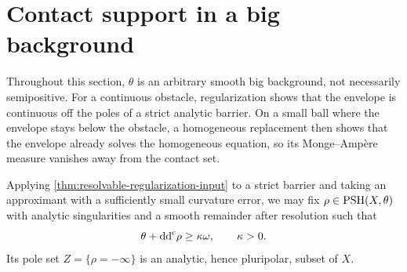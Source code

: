 \section{Contact support in a big background}
\label{sec:big-continuous-contact}

Throughout this section, $\theta$ is an arbitrary smooth big background, not necessarily semipositive. For a continuous obstacle, regularization shows that the envelope is continuous off the poles of a strict analytic barrier. On a small ball where the envelope stays below the obstacle, a homogeneous replacement then shows that the envelope already solves the homogeneous equation, so its Monge--Amp\`ere measure vanishes away from the contact set.

Applying \cref{thm:resolvable-regularization-input} to a strict barrier and taking an approximant with a sufficiently small curvature error, we may fix $\rho\in\mathrm{PSH}(X,\theta)$ with analytic singularities and a smooth remainder after resolution such that
\[
 \theta+\mathrm{dd}^{\mathrm{c}}\rho\geq\kappa\omega,\qquad\kappa>0.
\]
Its pole set $Z=\{\rho=-\infty\}$ is an analytic, hence pluripolar, subset of $X$.

